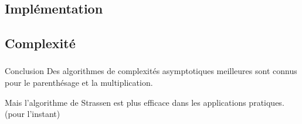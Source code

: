\documentclass{beamer}
\begin{document}
\subsection{Implémentation}
\begin{frame}
  \frametitle{\insertsubsection}
\end{frame}

\subsection{Complexité}
\begin{frame}
  \frametitle{\insertsubsection}
\end{frame}



\begin{frame}{Conclusion}
  Des algorithmes de complexités asymptotiques meilleures
  sont connus pour le parenthésage et la multiplication.

  Mais l'algorithme de Strassen est plus efficace dans les
  applications pratiques. (pour l'instant)
\end{frame}
\end{document}
